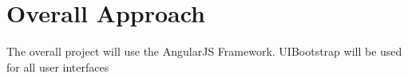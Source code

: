 \chapter{Overall Approach} 
\label{Chapter:Overall Approach}
The overall project will use the AngularJS Framework. UIBootstrap will be used for all user interfaces